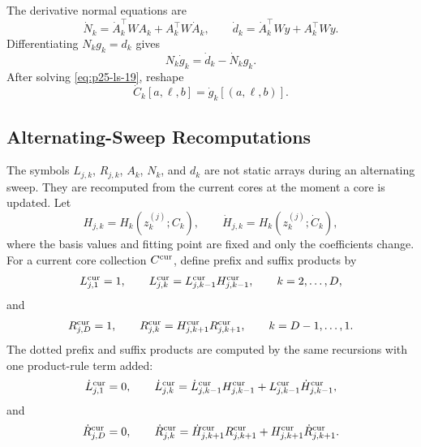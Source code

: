 \documentclass[11pt]{article}
\numberwithin{equation}{section}
\begin{document}
The derivative normal equations are
\begin{equation}
    \dot N_k
    =
    \dot A_k^\top W A_k+A_k^\top W\dot A_k,
    \qquad
    \dot d_k
    =
    \dot A_k^\top W y+A_k^\top W\dot y.
    \label{eq:p25-ls-18}
\end{equation}
Differentiating \(N_kg_k=d_k\) gives
\begin{equation}
    N_k\dot g_k=\dot d_k-\dot N_k g_k.
    \label{eq:p25-ls-19}
\end{equation}
After solving \eqref{eq:p25-ls-19}, reshape
\begin{equation}
    \dot C_k[a,\ell,b]=\dot g_k[(a,\ell,b)].
    \label{eq:p25-ls-20}
\end{equation}

\subsection{Alternating-Sweep Recomputations}

The symbols \(L_{j,k}\), \(R_{j,k}\), \(A_k\), \(N_k\), and \(d_k\) are not
static arrays during an alternating sweep.  They are recomputed from the
current cores at the moment a core is updated.  Let
\begin{equation}
    H_{j,k}=H_k(z_k^{(j)};C_k),
    \qquad
    \dot H_{j,k}=H_k(z_k^{(j)};\dot C_k),
    \label{eq:p26-sweep-recompute-1}
\end{equation}
where the basis values and fitting point are fixed and only the coefficients
change.  For a current core collection \(C^{\rm cur}\), define prefix and
suffix products by
\begin{equation}
    L_{j,1}^{\rm cur}=1,\qquad
    L_{j,k}^{\rm cur}=L_{j,k-1}^{\rm cur}H_{j,k-1}^{\rm cur},
    \qquad k=2,\ldots,D,
    \label{eq:p26-sweep-recompute-2}
\end{equation}
and
\begin{equation}
    R_{j,D}^{\rm cur}=1,\qquad
    R_{j,k}^{\rm cur}=H_{j,k+1}^{\rm cur}R_{j,k+1}^{\rm cur},
    \qquad k=D-1,\ldots,1.
    \label{eq:p26-sweep-recompute-3}
\end{equation}
The dotted prefix and suffix products are computed by the same recursions with
one product-rule term added:
\begin{equation}
    \dot L_{j,1}^{\rm cur}=0,\qquad
    \dot L_{j,k}^{\rm cur}
    =
    \dot L_{j,k-1}^{\rm cur}H_{j,k-1}^{\rm cur}
    +
    L_{j,k-1}^{\rm cur}\dot H_{j,k-1}^{\rm cur},
    \label{eq:p26-sweep-recompute-4}
\end{equation}
and
\begin{equation}
    \dot R_{j,D}^{\rm cur}=0,\qquad
    \dot R_{j,k}^{\rm cur}
    =
    \dot H_{j,k+1}^{\rm cur}R_{j,k+1}^{\rm cur}
    +
    H_{j,k+1}^{\rm cur}\dot R_{j,k+1}^{\rm cur}.
    \label{eq:p26-sweep-recompute-5}
\end{equation}
\end{document}
